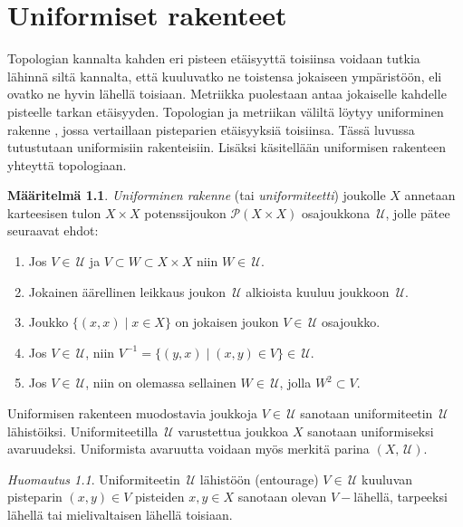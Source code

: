 \documentclass[12pt,a4paper,leqno]{report}
\newcommand{\U}{\,\mathcal{U}}
\newcommand{\Pot}{\mathcal{P}}
\theoremstyle{plain}
\theoremstyle{definition}
\newtheorem{maar}[equation]{Määritelmä}
\theoremstyle{remark}
\newtheorem{huom}[equation]{Huomautus}
\begin{document}
\chapter{Uniformiset rakenteet}
Topologian kannalta kahden eri pisteen etäisyyttä toisiinsa voidaan tutkia lähinnä siltä kannalta, että kuuluvatko ne toistensa jokaiseen ympäristöön, eli ovatko ne hyvin lähellä toisiaan. 
Metriikka puolestaan antaa jokaiselle kahdelle pisteelle tarkan etäisyyden. 
Topologian ja metriikan väliltä löytyy uniforminen rakenne \cite[luku~II]{Eom1}, 
jossa vertaillaan pisteparien etäisyyksiä toisiinsa. 
Tässä luvussa tutustutaan uniformisiin rakenteisiin. 
Lisäksi käsitellään uniformisen rakenteen yhteyttä topologiaan. 
\begin{maar}\label{uniformi_maar}
\emph{Uniforminen rakenne} (tai \emph{uniformiteetti}) joukolle $X$ annetaan karteesisen tulon $X\times X$ potenssijoukon $\Pot(X\times X)$ osajoukkona $\U$, jolle pätee seuraavat ehdot: %
\begin{enumerate} [label=(U\arabic*),ref=(U\arabic*)]
\item\label{F_I} Jos $V\in \U$ ja $V\subset W\subset X\times X$ niin $ W\in\U$.
\item\label{F_II} Jokainen äärellinen leikkaus joukon $\U$ alkioista kuuluu joukkoon $\U$.
\item\label{U_I} Joukko $\{(x,x)\mid x\in X\}$ on jokaisen joukon $V\in\U$ osajoukko.
\item\label{U_II} Jos $V\in\U$, niin $V^{-1}=\{(y,x)\mid (x,y)\in V\}\in\U$.
\item\label{U_III} Jos $V\in \U$, niin on olemassa sellainen $W\in \U$, jolla $ W^2\subset V$.%
\end{enumerate}
Uniformisen rakenteen muodostavia joukkoja $ V\in\U$ sanotaan uniformiteetin $\U$ lähistöiksi. 
Uniformiteetilla $\U$ varustettua joukkoa $X$ sanotaan uniformiseksi avaruudeksi.
Uniformista avaruutta voidaan myös merkitä parina $(X,\U)$.
\end{maar}
\begin{huom}\label{V-close}
Uniformiteetin $\U$ lähistöön (entourage) $V\in\U $ kuuluvan 
pisteparin $(x,y)\in V$ pisteiden $x,y\in X$ sanotaan olevan $V-$lähellä, 
tarpeeksi lähellä tai mielivaltaisen lähellä toisiaan.
\end{huom}
\end{document}
